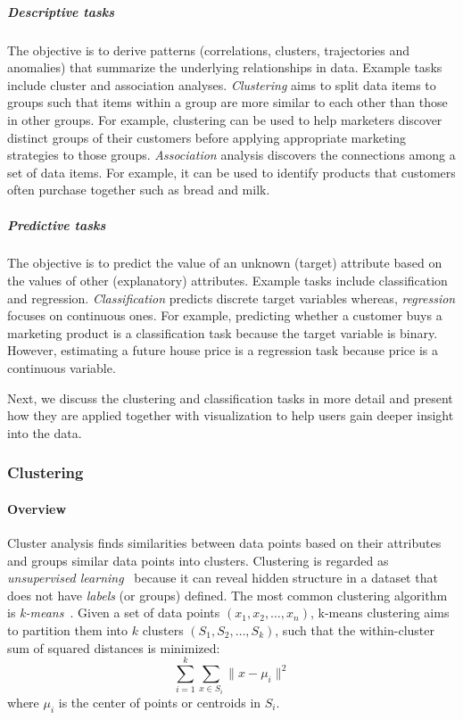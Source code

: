 \subparagraph{Descriptive tasks} The objective is to derive patterns (correlations, clusters, trajectories and anomalies) that summarize the underlying relationships in data. Example tasks include cluster and association analyses. \emph{Clustering} aims to split data items to groups such that items within a group are more similar to each other than those in other groups. For example, clustering can be used to help marketers discover distinct groups of their customers before applying appropriate marketing strategies to those groups. \emph{Association} analysis discovers the connections among a set of data items. For example, it can be used to identify products that customers often purchase together such as bread and milk.

\subparagraph{Predictive tasks} The objective is to predict the value of an unknown (target) attribute based on the values of other (explanatory) attributes. Example tasks include classification and regression. \emph{Classification} predicts discrete target variables whereas, \emph{regression} focuses on continuous ones. For example, predicting whether a customer buys a marketing product is a classification task because the target variable is binary. However, estimating a future house price is a regression task because price is a continuous variable.

\vspace{2mm}
\noindent Next, we discuss the clustering and classification tasks in more detail and present how they are applied together with visualization to help users gain deeper insight into the data.

\subsubsection{Clustering}

\paragraph{Overview}
Cluster analysis finds similarities between data points based on their attributes and groups similar data points into clusters. Clustering is regarded as \emph{unsupervised learning}~\cite{Han2011} because it can reveal hidden structure in a dataset that does not have \emph{labels} (or groups) defined. The most common clustering algorithm is \emph{k-means}~\cite{Lloyd1982}. Given a set of data points $(x_1, x_2, \dots, x_n)$, k-means clustering aims to partition them into $k$ clusters $(S_1, S_2, \dots, S_k)$, such that the within-cluster sum of squared distances is minimized:
\[
\sum_{i=1}^k\sum_{x\in S_i} \lVert x-\mu_i \rVert^2
\]
where $\mu_i$ is the center of points or centroids in $S_i$.

